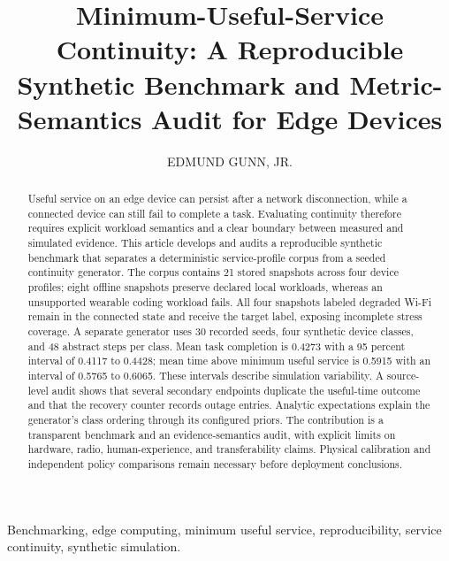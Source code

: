 \documentclass{ieeeaccess}
\begin{document}
\title{Minimum-Useful-Service Continuity: A Reproducible Synthetic Benchmark and Metric-Semantics Audit for Edge Devices}
\author{\uppercase{Edmund Gunn, Jr.}}
\address[1]{gunnchOS Research (e-mail: egunnjr@gunnchos.com). ORCID: 0009-0004-6546-2609.}
\begin{abstract}
Useful service on an edge device can persist after a network disconnection, while a connected device can still fail to complete a task. Evaluating continuity therefore requires explicit workload semantics and a clear boundary between measured and simulated evidence. This article develops and audits a reproducible synthetic benchmark that separates a deterministic service-profile corpus from a seeded continuity generator. The corpus contains 21 stored snapshots across four device profiles; eight offline snapshots preserve declared local workloads, whereas an unsupported wearable coding workload fails. All four snapshots labeled degraded Wi-Fi remain in the connected state and receive the target label, exposing incomplete stress coverage. A separate generator uses 30 recorded seeds, four synthetic device classes, and 48 abstract steps per class. Mean task completion is 0.4273 with a 95 percent interval of 0.4117 to 0.4428; mean time above minimum useful service is 0.5915 with an interval of 0.5765 to 0.6065. These intervals describe simulation variability. A source-level audit shows that several secondary endpoints duplicate the useful-time outcome and that the recovery counter records outage entries. Analytic expectations explain the generator's class ordering through its configured priors. The contribution is a transparent benchmark and an evidence-semantics audit, with explicit limits on hardware, radio, human-experience, and transferability claims. Physical calibration and independent policy comparisons remain necessary before deployment conclusions.
\end{abstract}
\begin{keywords}
Benchmarking, edge computing, minimum useful service, reproducibility, service continuity, synthetic simulation.
\end{keywords}
\titlepgskip=-18pt
\maketitle











\EOD
\end{document}
